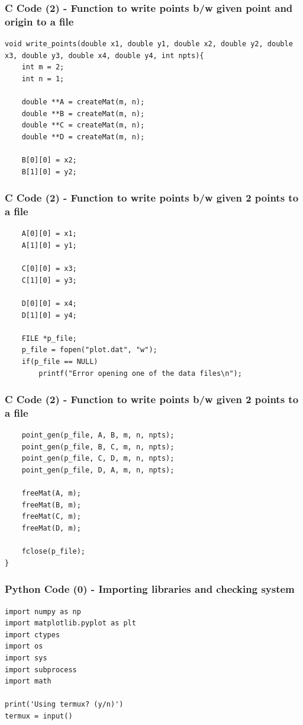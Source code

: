 \documentclass{beamer}
\begin{document}
\begin{frame}[fragile]
    \frametitle{C Code (2) - Function to write points b/w given point and origin to a file}

    \begin{lstlisting}
void write_points(double x1, double y1, double x2, double y2, double x3, double y3, double x4, double y4, int npts){
    int m = 2;
    int n = 1;

    double **A = createMat(m, n);
    double **B = createMat(m, n);
    double **C = createMat(m, n);
    double **D = createMat(m, n);

    B[0][0] = x2;
    B[1][0] = y2;
    \end{lstlisting}
\end{frame}
\begin{frame}[fragile]
    \frametitle{C Code (2) - Function to write points b/w given 2 points to a file}

    \begin{lstlisting}
    A[0][0] = x1;
    A[1][0] = y1;

    C[0][0] = x3;
    C[1][0] = y3;

    D[0][0] = x4;
    D[1][0] = y4;

    FILE *p_file;
    p_file = fopen("plot.dat", "w");
    if(p_file == NULL)
        printf("Error opening one of the data files\n");
    \end{lstlisting}
\end{frame}

\begin{frame}[fragile]
    \frametitle{C Code (2) - Function to write points b/w given 2 points to a file}
    \begin{lstlisting}
    point_gen(p_file, A, B, m, n, npts);
    point_gen(p_file, B, C, m, n, npts);
    point_gen(p_file, C, D, m, n, npts);
    point_gen(p_file, D, A, m, n, npts);

    freeMat(A, m);
    freeMat(B, m);
    freeMat(C, m);
    freeMat(D, m);

    fclose(p_file);
}
    \end{lstlisting}
\end{frame}

\begin{frame}[fragile]
    \frametitle{Python Code (0) - Importing libraries and checking system}
    \begin{lstlisting}
import numpy as np
import matplotlib.pyplot as plt
import ctypes
import os
import sys
import subprocess
import math

print('Using termux? (y/n)')
termux = input()
\end{lstlisting}
\end{frame}
\end{document}

